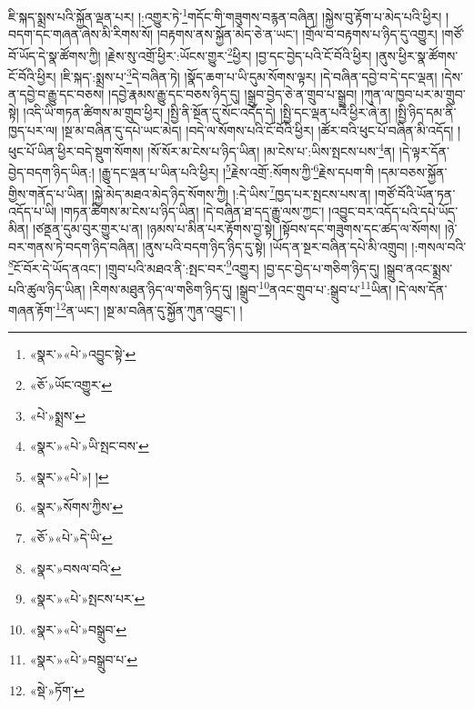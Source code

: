 ཇི་སྐད་སྨྲས་པའི་སྐྱོན་ལྡན་པར། །:འགྱུར་ཏེ་\footnote{«སྣར་»«པེ་»འབྱུང་སྟེ་}གདོང་གི་གཟུགས་བརྙན་བཞིན། །སྐྱེས་བུ་རྟོག་པ་མེད་པའི་ཕྱིར། །བདག་དང་གཞན་ཞེས་མི་རིགས་སོ། །བརྟགས་ནས་སྐྱོན་མེད་ཅེ་ན་ཡང་། །གྲོལ་བ་བརྟགས་པ་ཉིད་དུ་འགྱུར། །གཙོ་བོ་ཡོད་དེ་སྣ་ཚོགས་ཀྱི། །རྗེས་སུ་འགྲོ་ཕྱིར་:ཡོངས་གྱུར་\footnote{«ཅོ་»ཡོང་འགྱུར་}ཕྱིར། །བྱ་དང་བྱེད་པའི་ངོ་བོའི་ཕྱིར། །ནུས་ཕྱིར་སྣ་ཚོགས་ངོ་བོའི་ཕྱིར། །ཇི་སྐད་:སྨྲས་པ་\footnote{«པེ་»སྨྲས་}དེ་བཞིན་ཏེ། །སྣོད་ཆག་པ་ཡི་དུམ་སོགས་ལྟར། །དེ་བཞིན་དབྱེ་བ་དེ་དང་ལྡན། །དེས་ན་དབྱེ་བ་རྒྱུ་དང་བཅས། །དབྱེ་རྣམས་རྒྱུ་དང་བཅས་ཉིད་དུ། །སྒྲུབ་བྱེད་ཅེ་ན་གྲུབ་པ་སྒྲུབ། །ཀུན་ལ་ཁྱབ་པར་མ་གྲུབ་སྟེ། །འདི་ཡི་གཏན་ཚིགས་མ་གྲུབ་ཕྱིར། །སྤྱི་ནི་སྔོན་དུ་སོང་འདོད་དེ། །སྤྱི་དང་ལྡན་པའི་ཕྱིར་ཞེ་ན། །སྤྱི་ཉིད་དམ་ནི་ཁྱད་པར་ལ། །སྔ་མ་བཞིན་དུ་དཔེ་ཡང་མེད། །བདེ་ལ་སོགས་པའི་ངོ་བོའི་ཕྱིར། །ཚོར་བའི་ཕུང་པོ་བཞིན་མི་འདོད། །ཕུང་པོ་ཡིན་ཕྱིར་བདེ་སྡུག་སོགས། །སོ་སོར་མ་ངེས་པ་ཉིད་ཡིན། །མ་ངེས་པ་:ཡིས་སྤངས་པས་\footnote{«སྣར་»«པེ་»ཡི་སྤང་བས་}ན། །དེ་ལྟར་དོན་བྱེད་བདག་ཉིད་ཡིན:། །རྒྱུ་དང་ལྡན་པ་ཡིན་པའི་ཕྱིར། །\footnote{«སྣར་»«པེ་»། །}རྗེས་འགྲོ་:སོགས་ཀྱི་\footnote{«སྣར་»སོགས་ཀྱིས་}རྗེས་དཔག་གི །དམ་བཅས་སྐྱོན་གྱིས་གནོད་པ་ཡིན། །སྐྱེ་མེད་མཐའ་མེད་ཉིད་སོགས་ཀྱི། །:དེ་ཡིས་\footnote{«ཅོ་»«པེ་»དེ་ཡི་}ཁྱད་པར་སྤངས་པས་ན། །གཙོ་བོའི་ཡོན་ཏན་འདོད་པ་ཡི། །གཏན་ཚིགས་མ་ངེས་པ་ཉིད་ཡིན། །དེ་བཞིན་ཐ་དད་རྒྱུ་ལས་ཀྱང་། །འབྱུང་བར་འདོད་པའི་དཔེ་ཡོད་མིན། །ཙནྡན་དུམ་བུར་གྱུར་པ་ན། །ཉམས་པ་མིན་པར་རྟོགས་བྱ་སྟེ། །སྟོབས་དང་གཟུགས་དང་ཚད་ལ་སོགས། །ཉེ་བར་གནས་ཏེ་བདག་ཉིད་བཞིན། །ནུས་པའི་བདག་ཉིད་ཉིད་དུ་སྟེ། །ཡོད་ན་སྔར་བཞིན་དཔེ་མི་འགྲུབ། །:གསལ་བའི་\footnote{«སྣར་»བསལ་བའི་}ངོ་བོར་དེ་ཡོད་ནའང་། །གྲུབ་པའི་མཐའ་ནི་:སྤང་བར་\footnote{«སྣར་»«པེ་»སྤངས་པར་}འགྱུར། །བྱ་དང་བྱེད་པ་གཅིག་ཉིད་དུ། །སྒྲུབ་ནའང་སྨྲས་པའི་ཚུལ་ཉིད་ཡིན། །རིགས་མཐུན་ཉིད་ལ་གཅིག་ཉིད་དུ། །སྒྲུབ་\footnote{«སྣར་»«པེ་»བསྒྲུབ་}ནའང་གྲུབ་པ་:སྒྲུབ་པ་\footnote{«སྣར་»«པེ་»བསྒྲུབ་པ་}ཡིན། །དེ་ལས་དོན་གཞན་རྟོག་\footnote{«སྡེ་»ཏོག་}ན་ཡང་། །སྔ་མ་བཞིན་དུ་སྐྱོན་ཀུན་འབྱུང་། །
